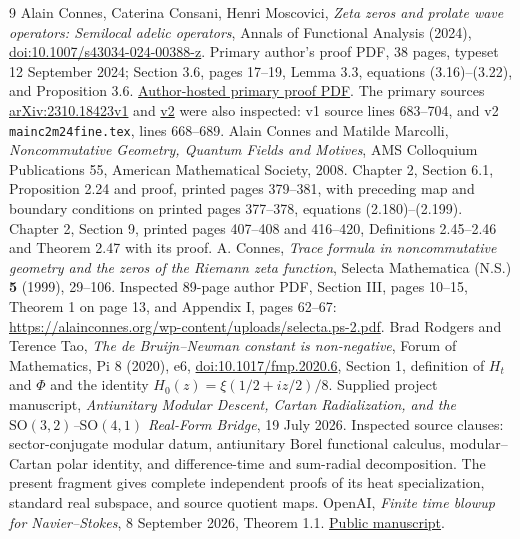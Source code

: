 \begin{thebibliography}{9}
 Alain Connes, Caterina Consani, Henri Moscovici,
\emph{Zeta zeros and prolate wave operators: Semilocal adelic operators},
Annals of Functional Analysis (2024),
\href{https://doi.org/10.1007/s43034-024-00388-z}{doi:10.1007/s43034-024-00388-z}.
Primary author's proof PDF, 38 pages, typeset 12 September 2024;
Section 3.6, pages 17--19, Lemma 3.3, equations (3.16)--(3.22),
and Proposition 3.6.
\href{https://alainconnes.org/wp-content/uploads/Zeta-zeros-and-prolateproofs-final-2024.pdf}{Author-hosted primary proof PDF}.
The primary sources
\href{https://arxiv.org/abs/2310.18423v1}{arXiv:2310.18423v1}
and \href{https://arxiv.org/abs/2310.18423v2}{v2} were also inspected:
v1 source lines 683--704, and v2
\texttt{mainc2m24fine.tex}, lines 668--689.
 Alain Connes and Matilde Marcolli,
\emph{Noncommutative Geometry, Quantum Fields and Motives},
AMS Colloquium Publications 55, American Mathematical Society, 2008.
Chapter 2, Section 6.1, Proposition 2.24 and proof,
printed pages 379--381, with preceding map and boundary conditions
on printed pages 377--378, equations (2.180)--(2.199).
Chapter 2, Section 9, printed pages 407--408 and 416--420,
Definitions 2.45--2.46 and Theorem 2.47 with its proof.
A. Connes,
\emph{Trace formula in noncommutative geometry and the zeros of the Riemann
zeta function},
Selecta Mathematica (N.S.) \textbf{5} (1999), 29--106.
Inspected 89-page author PDF, Section III, pages 10--15,
Theorem 1 on page 13, and Appendix I, pages 62--67:
\url{https://alainconnes.org/wp-content/uploads/selecta.ps-2.pdf}.
 Brad Rodgers and Terence Tao,
\emph{The de Bruijn--Newman constant is non-negative},
Forum of Mathematics, Pi 8 (2020), e6,
\href{https://doi.org/10.1017/fmp.2020.6}{doi:10.1017/fmp.2020.6},
Section 1, definition of $H_t$ and $\Phi$ and the identity
$H_0(z)=\xi(1/2+iz/2)/8$.
Supplied project manuscript,
\emph{Antiunitary Modular Descent, Cartan Radialization, and the
$\mathrm{SO}(3,2)$--$\mathrm{SO}(4,1)$ Real-Form Bridge},
19 July 2026.
Inspected source clauses: sector-conjugate modular datum,
antiunitary Borel functional calculus, modular--Cartan polar identity,
and difference-time and sum-radial decomposition.
The present fragment gives complete independent proofs of its
heat specialization, standard real subspace, and source quotient maps.
OpenAI, \emph{Finite time blowup for Navier--Stokes},
8 September 2026, Theorem 1.1.
\href{https://cdn.openai.com/pdf/32d9f210-8b73-45e0-91bc-82a30aef8a9a/navier-stokes.pdf}{Public manuscript}.

\end{thebibliography}
